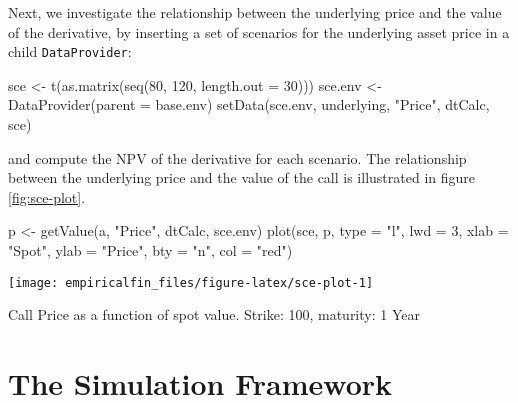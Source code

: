 \documentclass[justified]{tufte-book}
\newenvironment{Shaded}{}{}
\newcommand{\AttributeTok}[1]{\textcolor[rgb]{0.49,0.56,0.16}{#1}}
\newcommand{\DecValTok}[1]{\textcolor[rgb]{0.25,0.63,0.44}{#1}}
\newcommand{\FunctionTok}[1]{\textcolor[rgb]{0.02,0.16,0.49}{#1}}
\newcommand{\NormalTok}[1]{#1}
\newcommand{\OtherTok}[1]{\textcolor[rgb]{0.00,0.44,0.13}{#1}}
\newcommand{\StringTok}[1]{\textcolor[rgb]{0.25,0.44,0.63}{#1}}
\newcommand{\class}[1]{\texttt{#1}}
\begin{document}
Next, we investigate the relationship between the underlying price and the value of the derivative, by inserting a set of scenarios for the underlying asset price in a child \class{DataProvider}:

\begin{Shaded}
\begin{Highlighting}[]
\NormalTok{sce }\OtherTok{\textless{}{-}} \FunctionTok{t}\NormalTok{(}\FunctionTok{as.matrix}\NormalTok{(}\FunctionTok{seq}\NormalTok{(}\DecValTok{80}\NormalTok{, }\DecValTok{120}\NormalTok{, }\AttributeTok{length.out =} \DecValTok{30}\NormalTok{)))}
\NormalTok{sce.env }\OtherTok{\textless{}{-}} \FunctionTok{DataProvider}\NormalTok{(}\AttributeTok{parent =}\NormalTok{ base.env)}
\FunctionTok{setData}\NormalTok{(sce.env, underlying, }\StringTok{"Price"}\NormalTok{, dtCalc, sce)}
\end{Highlighting}
\end{Shaded}

and compute the NPV of the derivative for each scenario. The relationship between the underlying price and the value of the call is illustrated in figure \ref{fig:sce-plot}.

\begin{Shaded}
\begin{Highlighting}[]
\NormalTok{p }\OtherTok{\textless{}{-}} \FunctionTok{getValue}\NormalTok{(a, }\StringTok{"Price"}\NormalTok{, dtCalc, sce.env)}
\FunctionTok{plot}\NormalTok{(sce, p, }\AttributeTok{type =} \StringTok{"l"}\NormalTok{, }\AttributeTok{lwd =} \DecValTok{3}\NormalTok{, }\AttributeTok{xlab =} \StringTok{"Spot"}\NormalTok{, }\AttributeTok{ylab =} \StringTok{"Price"}\NormalTok{,}
    \AttributeTok{bty =} \StringTok{"n"}\NormalTok{, }\AttributeTok{col =} \StringTok{"red"}\NormalTok{)}
\end{Highlighting}
\end{Shaded}

\begin{marginfigure}
\texttt{[image: empiricalfin\_files/figure-latex/sce-plot-1]} \caption[Call Price as a function of spot value]{Call Price as a function of spot value. Strike: 100, maturity: 1 Year}\label{fig:sce-plot}
\end{marginfigure}

\hypertarget{sim-framework}{%
\chapter{The Simulation Framework}\label{sim-framework}}
\end{document}
